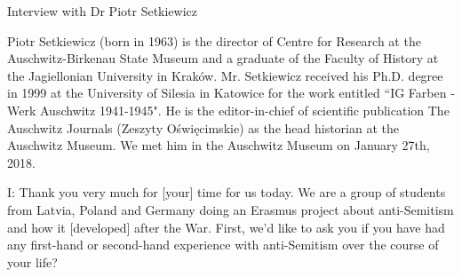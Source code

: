Interview with Dr Piotr Setkiewicz

Piotr Setkiewicz (born in 1963) is the director of Centre for Research at the Auschwitz-Birkenau State Museum and a graduate of the Faculty of History at the Jagiellonian University in Kraków. Mr. Setkiewicz received his Ph.D. degree in 1999 at the University of Silesia in Katowice for the work entitled “IG Farben - Werk Auschwitz 1941-1945". He is the editor-in-chief of scientific publication The Auschwitz Journals (Zeszyty Oświęcimskie) as the head historian at the Auschwitz Museum. We met him in the Auschwitz Museum on January 27th, 2018. 

I: Thank you very much for [your] time for us today. We are a group of students from Latvia, Poland and Germany doing an Erasmus project about anti-Semitism and how it [developed] after the War. First, we'd like to ask you if you have had any first-hand or second-hand experience with anti-Semitism over the course of your life?
